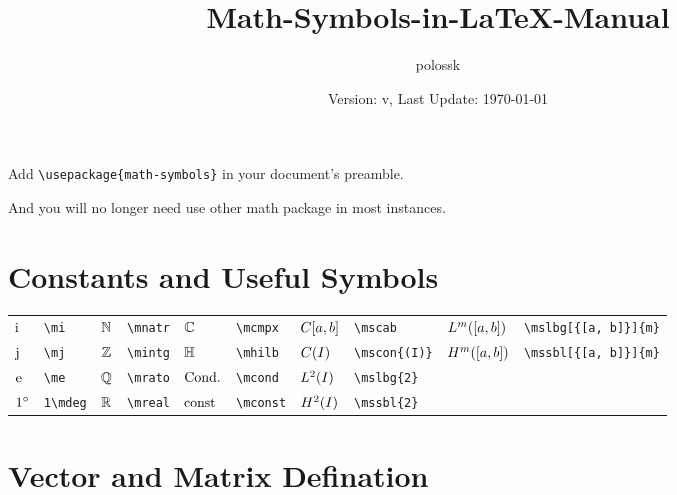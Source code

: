 \documentclass{article}
\title{Math-Symbols-in-\LaTeX{}-Manual}
\author{polossk}
\date{Version: v\artversion, Last Update: \today}
\begin{document}
\maketitle

Add \lstinline`\usepackage{math-symbols}` in your document's preamble.

And you will no longer need use other math package in most instances.

\thispagestyle{fancy}
\renewcommand{\baselinestretch}{1.25}


\section{Constants and Useful Symbols}
\begin{tabular}{*{10}{l}}
$\mi$ & \lstinline`\mi` & $\mnatr$ & \lstinline`\mnatr` & $\mcmpx$ & \lstinline`\mcmpx` & $\mscab$ & \lstinline`\mscab` & $\mslbg[{[a, b]}]{m}$ & \lstinline`\mslbg[{[a, b]}]{m}`\\
$\mj$ & \lstinline`\mj` & $\mintg$ & \lstinline`\mintg` & $\mhilb$ & \lstinline`\mhilb` & $\mscon{(I)}$ & \lstinline`\mscon{(I)}` & $\mssbl[{[a, b]}]{m}$ & \lstinline`\mssbl[{[a, b]}]{m}`\\
$\me$ & \lstinline`\me` & $\mrato$ & \lstinline`\mrato` & $\mcond$ & \lstinline`\mcond` & $\mslbg{2}$ & \lstinline`\mslbg{2}` & \\
$1\mdeg$ & \lstinline`1\mdeg` & $\mreal$ & \lstinline`\mreal` & $\mconst$ & \lstinline`\mconst` & $\mssbl{2}$ & \lstinline`\mssbl{2}` & \\
\end{tabular}


\section{Vector and Matrix Defination}


\end{document}
